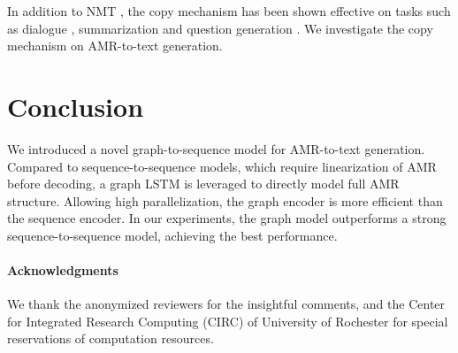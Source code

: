 \documentclass[11pt,a4paper]{article}
\begin{document}
In addition to NMT \cite{gulcehre-EtAl:2016:P16-1}, the copy mechanism has been shown effective on tasks such as dialogue \cite{gu-EtAl:2016:P16-1}, summarization \cite{see-liu-manning:2017:Long} and question generation \citep{song-naacl-18}.
We investigate the copy mechanism on AMR-to-text generation.


\section{Conclusion}

We introduced a novel graph-to-sequence model for AMR-to-text generation.
Compared to sequence-to-sequence models, which require linearization of AMR before decoding, a graph LSTM is leveraged to directly model full AMR structure.
Allowing high parallelization, the graph encoder is more efficient than the sequence encoder.
In our experiments, the graph model outperforms a strong sequence-to-sequence model, achieving the best performance.

\paragraph{Acknowledgments}
We thank the anonymized reviewers for the insightful comments, and the Center for Integrated Research Computing (CIRC) of University of Rochester for special reservations of computation resources.



\end{document}
